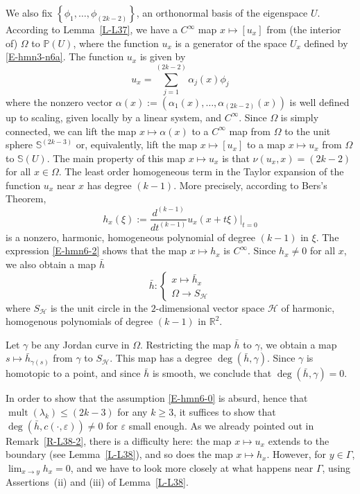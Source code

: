 \documentclass[12pt,a4paper]{amsart}
\theoremstyle{plain} %
\theoremstyle{definition}
\numberwithin{equation}{section}
\numberwithin{figure}{section}
\numberwithin{table}{section}
\newcommand{\bP}{\mathbb{P}}
\newcommand{\R}{\mathbb{R}}
\newcommand{\bS}{\mathbb{S}}
\newcommand{\cH}{\mathcal{H}}
\DeclareMathOperator{\mult}{mult}
\newcommand{\set}[1]{\left\lbrace #1 \right\rbrace}
\begin{document}
We also fix $\set{\phi_1,\ldots,\phi_{(2k-2)}}$, an orthonormal basis of the eigenspace $U$. According to Lemma~\ref{L-L37}, we have a $C^{\infty}$ map $x \mapsto [u_x]$ from (the interior of) $\Omega$ to $\bP(U)$, where the function $u_x$ is a generator of the space $U_x$ defined by \eqref{E-hmn3-n6a}. The function $u_x$ is given by
%
\begin{equation}\label{E-hmn6-2}
u_x = \sum_{j=1}^{(2k-2)} \alpha_j(x) \phi_j
\end{equation}
%
where the nonzero vector $\alpha(x) := (\alpha_1(x),\ldots,\alpha_{(2k-2)}(x))$ is well defined up to scaling, given locally by a linear system, and $C^{\infty}$. Since $\Omega$ is simply connected, we can lift the map $x \mapsto \alpha(x)$ to a $C^{\infty}$ map from $\Omega$ to the unit sphere $\bS^{(2k-3)}$ or, equivalently, lift the map $x \mapsto [u_x]$ to a map $x \mapsto u_x$ from $\Omega$ to $\bS(U)$. The main property of this map $x \mapsto u_x$ is that $\nu(u_x,x) = (2k-2)$ for all $x \in \Omega$. The least order homogeneous term in the Taylor expansion of the function $u_x$ near $x$ has degree $(k-1)$. More precisely, according to Bers's Theorem,
%
\begin{equation}\label{E-hmn6-4}
h_x(\xi) := \frac{d^{(k-1)}}{dt^{(k-1)}}u_x(x+t\xi)\big|_{t=0}
\end{equation}
%
is a nonzero, harmonic, homogeneous polynomial of degree $(k-1)$ in $\xi$. The expression \eqref{E-hmn6-2} shows that the map $x \mapsto h_x$ is $C^{\infty}$. Since $h_x \neq 0$ for all $x$, we also obtain a map $\bar{h}$
%
\begin{equation}\label{E-hmn6-6}
\bar{h} : \left\{
\begin{array}{l}
x \mapsto \bar{h}_x \\[5pt]
\Omega \to S_{\cH}
\end{array}
\right.
\end{equation}
%
where $S_{\cH}$ is the unit circle in the $2$-dimensional vector space $\cH$ of harmonic, homogenous polynomials of degree $(k-1)$ in $\R^2$.\medskip

Let $\gamma$ be any Jordan curve in $\Omega$. Restricting the map $\bar{h}$ to $\gamma$, we obtain a map $s \mapsto \bar{h}_{\gamma(s)}$ from $\gamma$ to $S_{\cH}$. This map has a degree $\deg(\bar{h},\gamma)$. Since $\gamma$ is homotopic to a point, and since $\bar{h}$ is smooth, we conclude that $\deg(\bar{h},\gamma) = 0$.\medskip

In order to show that the assumption \eqref{E-hmn6-0} is absurd, hence that $\mult(\lambda_k) \le (2k-3)$ for any $k \ge 3$, it suffices to show that $\deg(\bar{h},c(\cdot,\varepsilon))\neq 0$ for $\varepsilon$ small enough. As we already pointed out in Remark~\ref{R-L38-2}, there is a difficulty here: the map $x \mapsto u_x$ extends to the boundary (see Lemma~\ref{L-L38}), and so does the map $x \mapsto h_x$. However, for $y \in \Gamma$, $\lim_{x\to y} h_x = 0$, and we have to look more closely at what happens near $\Gamma$, using Assertions~(ii) and (iii) of Lemma~\ref{L-L38}.\smallskip
\end{document}
